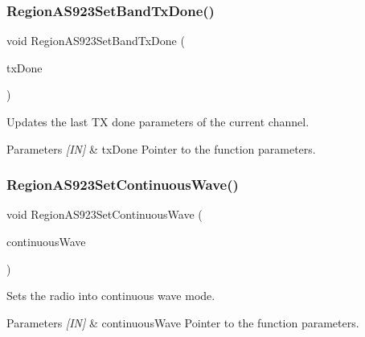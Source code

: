 \subsubsection{\texorpdfstring{Region\+A\+S923\+Set\+Band\+Tx\+Done()}{RegionAS923SetBandTxDone()}}
{\footnotesize\ttfamily void Region\+A\+S923\+Set\+Band\+Tx\+Done (\begin{DoxyParamCaption}\item[{\hyperlink{group__REGION_gad0524aa0673c0814a71e7a4f9cade3fc}{Set\+Band\+Tx\+Done\+Params\+\_\+t} $\ast$}]{tx\+Done }\end{DoxyParamCaption})}



Updates the last TX done parameters of the current channel. 


\begin{DoxyParams}{Parameters}
{\em \mbox{[}\+I\+N\mbox{]}} & tx\+Done Pointer to the function parameters. \\
\hline
\end{DoxyParams}
\mbox{\label{group__REGIONAS923_ga295747645e6d5ed51a52cb17cee132b4}} 
\subsubsection{\texorpdfstring{Region\+A\+S923\+Set\+Continuous\+Wave()}{RegionAS923SetContinuousWave()}}
{\footnotesize\ttfamily void Region\+A\+S923\+Set\+Continuous\+Wave (\begin{DoxyParamCaption}\item[{\hyperlink{group__REGION_gaf39bb5ba06921139c6d17f88a8d518cd}{Continuous\+Wave\+Params\+\_\+t} $\ast$}]{continuous\+Wave }\end{DoxyParamCaption})}



Sets the radio into continuous wave mode. 


\begin{DoxyParams}{Parameters}
{\em \mbox{[}\+I\+N\mbox{]}} & continuous\+Wave Pointer to the function parameters. \\
\hline
\end{DoxyParams}
\mbox{\label{group__REGIONAS923_gab4e1c5c1e67df4682b90950164afec03}} 
